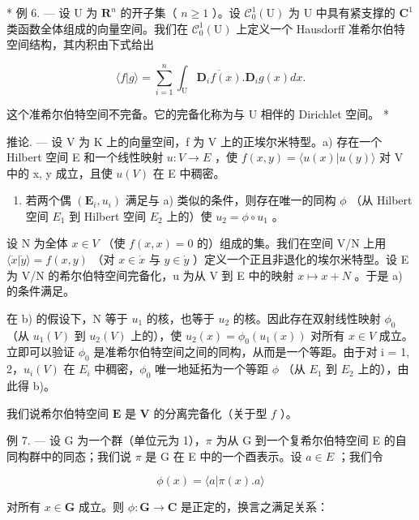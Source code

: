 * 例 6. --- 设 U 为 \(\mathbf{R}^n\) 的开子集（ \(n \geqslant 1\) ）。设 \(\mathcal{C}_0^1(\mathrm{U})\) 为 U 中具有紧支撑的 \(\mathbf{C}^1\) 类函数全体组成的向量空间。我们在 \(\mathcal{C}_0^1(\mathrm{U})\) 上定义一个 Hausdorff 准希尔伯特空间结构，其内积由下式给出

\[
\langle f | g \rangle = \sum_ {i = 1} ^ {n} \int_ {\mathrm{U}} \overline {{{{\mathbf {D} _ {i} f (x)}}}}. \mathbf {D} _ {i} g (x) d x.
\]

这个准希尔伯特空间不完备。它的完备化称为与 U 相伴的 Dirichlet 空间。 *

推论. --- 设 V 为 K 上的向量空间，f 为 V 上的正埃尔米特型。a) 存在一个 Hilbert 空间 E 和一个线性映射 \(u:V \rightarrow E\) ，使 \(f(x,y) = \langle u(x)|u(y) \rangle\) 对 V 中的 x, y 成立，且使 \(u(V)\) 在 E 中稠密。

\begin{enumerate}
\def\labelenumi{\alph{enumi})}
\setcounter{enumi}{1}
\tightlist
\item
  若两个偶 \((\mathbf{E}_{i}, u_{i})\) 满足与 a) 类似的条件，则存在唯一的同构 \(\phi\) （从 Hilbert 空间 \(E_{1}\) 到 Hilbert 空间 \(E_{2}\) 上的）使 \(u_{2} = \phi \circ u_{1}\) 。
\end{enumerate}

设 N 为全体 \(x \in V\) （使 \(f(x, x) = 0\) 的）组成的集。我们在空间 V/N 上用 \(\langle \dot{x} | \dot{y} \rangle = f(x, y)\) （对 \(x \in \dot{x}\) 与 \(y \in \dot{y}\) ）定义一个正且非退化的埃尔米特型。设 E 为 V/N 的希尔伯特空间完备化，u 为从 V 到 E 中的映射 \(x \mapsto x + N\) 。于是 a) 的条件满足。

在 b) 的假设下，N 等于 \(u_{1}\) 的核，也等于 \(u_{2}\) 的核。因此存在双射线性映射 \(\phi_{0}\) （从 \(u_{1}(V)\) 到 \(u_{2}(V)\) 上的），使 \(u_{2}(x) = \phi_{0}(u_{1}(x))\) 对所有 \(x \in V\) 成立。立即可以验证 \(\phi_{0}\) 是准希尔伯特空间之间的同构，从而是一个等距。由于对 i = 1, 2，\(u_{i}(V)\) 在 \(E_{i}\) 中稠密，\(\phi_{0}\) 唯一地延拓为一个等距 \(\phi\) （从 \(E_{1}\) 到 \(E_{2}\) 上的），由此得 b)。

我们说希尔伯特空间 \(\mathbf{E}\) 是 \(\mathbf{V}\) 的分离完备化（关于型 \(f\) ）。

例 7. --- 设 G 为一个群（单位元为 1），\(\pi\) 为从 G 到一个复希尔伯特空间 E 的自同构群中的同态；我们说 \(\pi\) 是 G 在 E 中的一个酉表示。设 \(a \in E\) ；我们令

\[
\phi (x) = \langle a | \pi (x). a \rangle
\]

对所有 \(x \in \mathbf{G}\) 成立。则 \(\phi : \mathbf{G} \to \mathbf{C}\) 是正定的，换言之满足关系：

